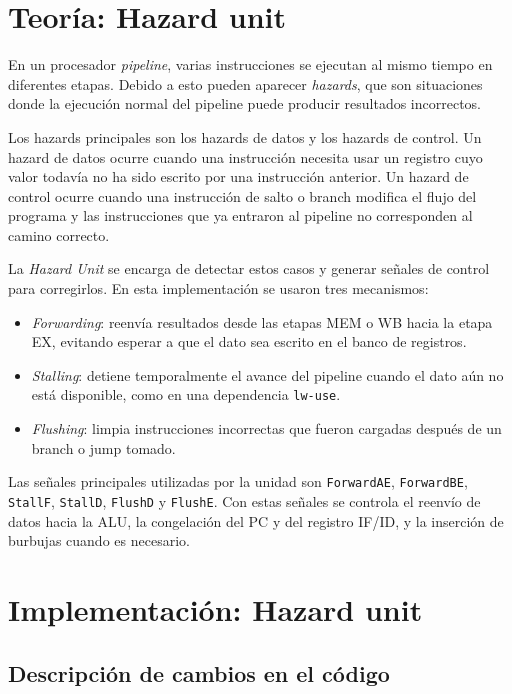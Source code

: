 \section{Teoría: Hazard unit}

En un procesador \textit{pipeline}, varias instrucciones se ejecutan al mismo tiempo en diferentes etapas. Debido a esto pueden aparecer \textit{hazards}, que son situaciones donde la ejecución normal del pipeline puede producir resultados incorrectos.

Los hazards principales son los hazards de datos y los hazards de control. Un hazard de datos ocurre cuando una instrucción necesita usar un registro cuyo valor todavía no ha sido escrito por una instrucción anterior. Un hazard de control ocurre cuando una instrucción de salto o branch modifica el flujo del programa y las instrucciones que ya entraron al pipeline no corresponden al camino correcto.

La \textit{Hazard Unit} se encarga de detectar estos casos y generar señales de control para corregirlos. En esta implementación se usaron tres mecanismos:

\begin{itemize}
    \item \textit{Forwarding}: reenvía resultados desde las etapas MEM o WB hacia la etapa EX, evitando esperar a que el dato sea escrito en el banco de registros.
    \item \textit{Stalling}: detiene temporalmente el avance del pipeline cuando el dato aún no está disponible, como en una dependencia \texttt{lw-use}.
    \item \textit{Flushing}: limpia instrucciones incorrectas que fueron cargadas después de un branch o jump tomado.
\end{itemize}

Las señales principales utilizadas por la unidad son \texttt{ForwardAE}, \texttt{ForwardBE}, \texttt{StallF}, \texttt{StallD}, \texttt{FlushD} y \texttt{FlushE}. Con estas señales se controla el reenvío de datos hacia la ALU, la congelación del PC y del registro IF/ID, y la inserción de burbujas cuando es necesario.

\section{Implementación: Hazard unit}

\subsection{Descripción de cambios en el código}

